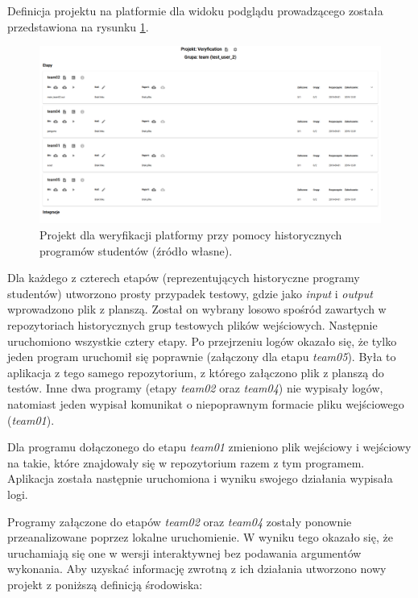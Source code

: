 Definicja projektu na platformie dla widoku podglądu prowadzącego została przedstawiona na rysunku \ref{fig:veryfication_first_project}.

\begin{figure}[h]
    \centering
    \includegraphics[width = 12cm]{chapter06/veryfication_first_project.png}
    \caption{Projekt dla weryfikacji platformy przy pomocy historycznych programów studentów (źródło własne).}
    \label{fig:veryfication_first_project}
\end{figure}

Dla każdego z czterech etapów (reprezentujących historyczne programy studentów) utworzono prosty przypadek testowy, gdzie jako \textit{input} i \textit{output} wprowadzono plik z planszą.
Został on wybrany losowo spośród zawartych w repozytoriach historycznych grup testowych plików wejściowych.
Następnie uruchomiono wszystkie cztery etapy.
Po przejrzeniu logów okazało się, że tylko jeden program uruchomił się poprawnie (załączony dla etapu \textit{team05}).
Była to aplikacja z tego samego repozytorium, z którego załączono plik z planszą do testów.
Inne dwa programy (etapy \textit{team02} oraz \textit{team04}) nie wypisały logów, natomiast jeden wypisał komunikat o niepoprawnym formacie pliku wejściowego (\textit{team01}).

Dla programu dołączonego do etapu \textit{team01} zmieniono plik wejściowy i wejściowy na takie, które znajdowały się w repozytorium razem z tym programem.
Aplikacja została następnie uruchomiona i wyniku swojego działania wypisała logi.

Programy załączone do etapów \textit{team02} oraz \textit{team04} zostały ponownie przeanalizowane poprzez lokalne uruchomienie.
W wyniku tego okazało się, że uruchamiają się one w wersji interaktywnej bez podawania argumentów wykonania.
Aby uzyskać informację zwrotną z ich działania utworzono nowy projekt z poniższą definicją środowiska:

